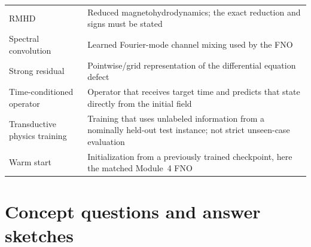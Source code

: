 \documentclass[11pt]{article}
\begin{document}
\begin{longtable}{p{}p{}}
RMHD & Reduced magnetohydrodynamics; the exact reduction and signs must be stated \\
Spectral convolution & Learned Fourier-mode channel mixing used by the FNO \\
Strong residual & Pointwise/grid representation of the differential equation defect \\
Time-conditioned operator & Operator that receives target time and predicts that state directly from the initial field \\
Transductive physics training & Training that uses unlabeled information from a nominally held-out test instance; not strict unseen-case evaluation \\
Warm start & Initialization from a previously trained checkpoint, here the matched Module~4 FNO \\
\bottomrule
\end{longtable}

\section{Concept questions and answer sketches}
\label{app:questions}
\end{document}
